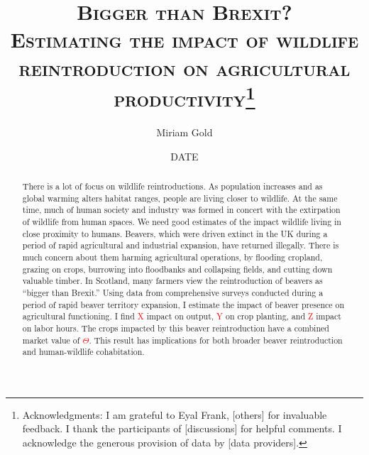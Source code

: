 \documentclass[11pt, english, letterpaper]{article}
\begin{document}
\justifying


\title{\vspace{-2em}\textsc{Bigger than Brexit? \\ Estimating the impact of wildlife reintroduction on agricultural productivity}\thanks{Acknowledgments: I am grateful to Eyal Frank, [others] for invaluable feedback. I thank the participants of [discussions] for helpful comments. I acknowledge the generous provision of data by [data providers].}}

\author[1]{\small Miriam Gold}

\date{DATE}
\maketitle


\begin{abstract}
    \singlespacing 
    There is a lot of focus on wildlife reintroductions. As population increases and as global warming alters habitat ranges, people are living closer to wildlife. At the same time, much of human society and industry was formed in concert with the extirpation of wildlife from human spaces. We need good estimates of the impact wildlife living in close proximity to humans. Beavers, which were driven extinct in the UK during a period of rapid agricultural and industrial expansion, have returned illegally. There is much concern about them harming agricultural operations, by flooding cropland, grazing on crops, burrowing into floodbanks and collapsing fields, and cutting down valuable timber. In Scotland, many farmers view the reintroduction of beavers as ``bigger than Brexit.'' Using data from comprehensive surveys conducted during a period of rapid beaver territory expansion, I estimate the impact of beaver presence on agricultural functioning. I find \textcolor{red}{X} impact on output, \textcolor{red}{Y} on crop planting, and \textcolor{red}{Z} impact on labor hours. The crops impacted by this beaver reintroduction have a combined market value of \textcolor{red}{$\Theta$}. This result has implications for both broader beaver reintroduction and human-wildlife cohabitation. 
\end{abstract}
\end{document}
